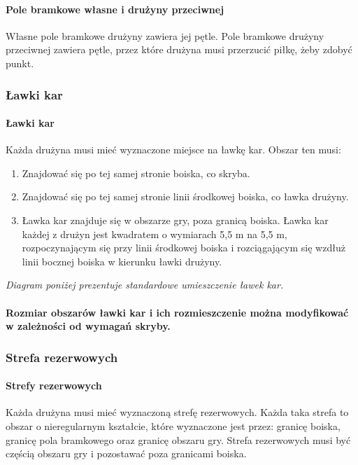 \documentclass[12pt]{article}
\begin{document}
\paragraph{Pole bramkowe własne i drużyny przeciwnej}
Własne pole bramkowe drużyny zawiera jej pętle. Pole bramkowe drużyny
przeciwnej zawiera pętle, przez które drużyna musi przerzucić piłkę,
żeby zdobyć punkt.

\subsubsection{Ławki kar}

\paragraph{Ławki kar}
Każda drużyna musi mieć wyznaczone miejsce
na ławkę kar. Obszar ten musi:
\begin{enumerate}
	\item Znajdować się po tej samej stronie boiska, co skryba.

	\item Znajdować się po tej samej stronie linii środkowej boiska, co ławka
	      drużyny.

	\item Ławka kar znajduje się w obszarze gry, poza granicą boiska. Ławka kar
	      każdej z drużyn jest kwadratem o wymiarach 5,5 m na 5,5 m,
	      rozpoczynającym się przy linii środkowej boiska i rozciągającym się
	      wzdłuż linii bocznej boiska w kierunku ławki drużyny.
\end{enumerate}

\textit{Diagram poniżej prezentuje standardowe umieszczenie ławek kar.}

\paragraph{Rozmiar obszarów ławki kar i ich rozmieszczenie można
	modyfikować w zależności od wymagań skryby.}

\subsubsection{Strefa rezerwowych}

\paragraph{Strefy rezerwowych}
Każda drużyna musi mieć
wyznaczoną strefę rezerwowych. Każda taka strefa to obszar o
nieregularnym kształcie, które wyznaczone jest przez: granicę boiska,
granicę pola bramkowego oraz granicę obszaru gry. Strefa rezerwowych
musi być częścią obszaru gry i pozostawać poza granicami boiska.
\end{document}
